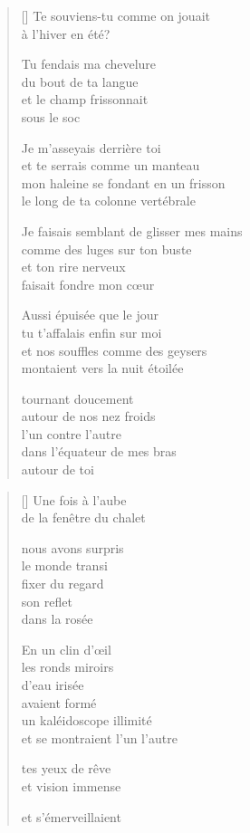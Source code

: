 \documentclass[12pt,a4paper]{article}
\begin{document}
\begin{verse}[\versewidth]
  Te souviens-tu comme on jouait \\
  à l'hiver en été?

  Tu fendais ma chevelure \\
  du bout de ta langue \\
  et le champ frissonnait \\
  sous le soc

  Je m'asseyais derrière toi \\
  et te serrais comme un manteau \\
  mon haleine se fondant en un frisson \\
  le long de ta colonne vertébrale

  Je faisais semblant de glisser mes mains \\
  comme des luges sur ton buste \\
  et ton rire nerveux \\
  faisait fondre mon cœur

  Aussi épuisée que le jour \\
  tu t'affalais enfin sur moi \\
  et nos souffles comme des geysers \\
  montaient vers la nuit étoilée

  tournant doucement \\
  autour de nos nez froids \\
  l'un contre l'autre \\
  dans l'équateur de mes bras \\
  autour de toi
\end{verse}


\newpage

\poemtitle{}

\settowidth{\versewidth}{et se montraient l'un l'autre}

\bigskip

\begin{verse}[\versewidth]
  Une fois à l'aube \\
  de la fenêtre du chalet

  nous avons surpris \\
  le monde transi \\
  fixer du regard \\
  son reflet \\
  dans la rosée

  En un clin d'œil \\
  les ronds miroirs \\
  d'eau irisée \\
  avaient formé \\
  un kaléidoscope illimité \\
  et se montraient l'un l'autre

  tes yeux de rêve \\
  et vision immense

  et s'émerveillaient
\end{verse}
\end{document}
